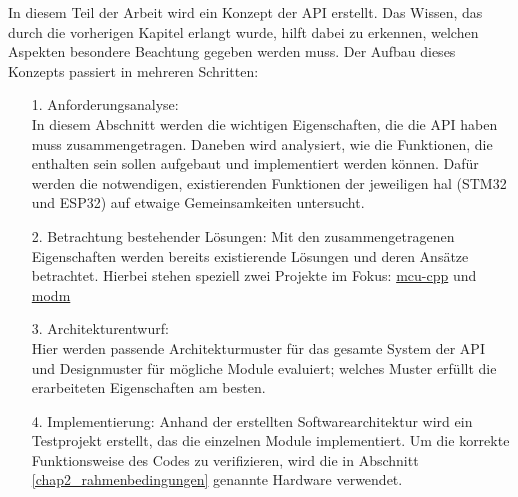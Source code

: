 In diesem Teil der Arbeit wird ein Konzept der API erstellt.
Das Wissen, das durch die vorherigen Kapitel erlangt wurde, hilft dabei zu erkennen, welchen Aspekten besondere Beachtung gegeben werden muss.
Der Aufbau dieses Konzepts passiert in mehreren Schritten:
\begin{itemize}
	\item [1.]  Anforderungsanalyse: \\In diesem Abschnitt werden die wichtigen Eigenschaften, die die API haben muss zusammengetragen. Daneben wird analysiert, wie die Funktionen, die enthalten sein sollen aufgebaut und implementiert werden können. Dafür werden die notwendigen, existierenden Funktionen der jeweiligen \gls{hal} (STM32 und ESP32) auf etwaige Gemeinsamkeiten untersucht.
 	\item [2.] 	Betrachtung bestehender Lösungen: Mit den zusammengetragenen Eigenschaften werden bereits existierende Lösungen und deren Ansätze betrachtet. Hierbei stehen speziell zwei Projekte im Fokus: \href{https://github.com/yh-sb/mcu-cpp.git}{mcu-cpp} und \href{https://github.com/modm-io/modm.git}{modm}
	\item [3.] Architekturentwurf: \\Hier werden passende Architekturmuster für das gesamte System der API und Designmuster für mögliche Module evaluiert; welches Muster erfüllt die erarbeiteten Eigenschaften am besten.
	\item [4.] Implementierung: Anhand der erstellten Softwarearchitektur wird ein Testprojekt erstellt, das die einzelnen Module implementiert. Um die korrekte Funktionsweise des Codes zu verifizieren, wird die in Abschnitt \ref{chap2_rahmenbedingungen} genannte Hardware verwendet. 
\end{itemize}

